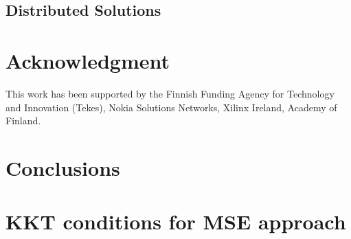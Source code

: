 \documentclass[10pt,final,twocolumn,letterpaper]{./../Styles/IEEEtran}
\begin{document}
\subsection{Distributed Solutions}


\section*{Acknowledgment}
This work has been supported by the Finnish Funding Agency for Technology and Innovation (Tekes), Nokia Solutions Networks, Xilinx Ireland, Academy of Finland.

\acresetall
\section{Conclusions} \label{sec-6}


\appendices

%

\section{\ac{KKT} conditions for \ac{MSE} approach} \label{a-1}




\end{document}
